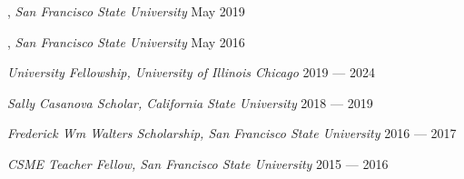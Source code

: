 
, \textit{San Francisco State University}	\hfill May 2019

, \textit{San Francisco State University} \hfill	May 2016

\textit{University Fellowship, University of Illinois Chicago} 	\hfill 2019 --- 2024

\textit{Sally Casanova Scholar, California State University} \hfill	2018 --- 2019

\textit{Frederick Wm Walters Scholarship, San Francisco State University}	\hfill 2016 --- 2017

\textit{CSME Teacher Fellow, San Francisco State University} \hfill	2015 --- 2016


